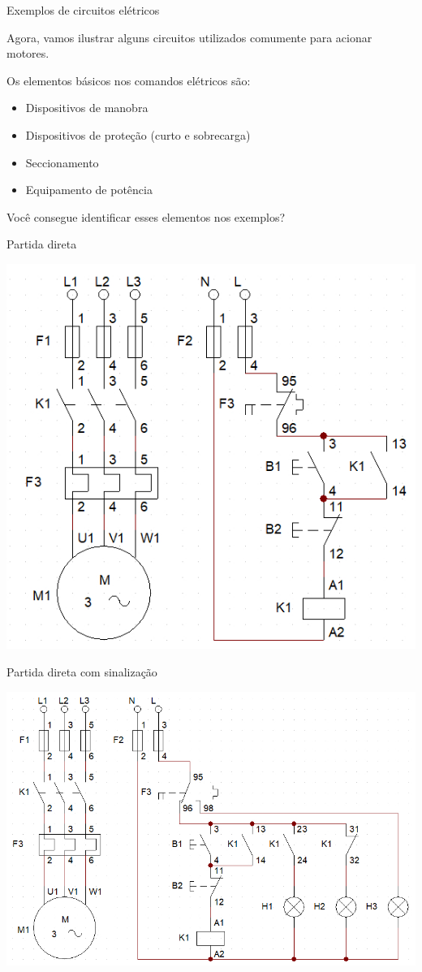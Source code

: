 \begin{frame}{Exemplos de circuitos elétricos}
\begin{block}{}
	Agora, vamos ilustrar alguns circuitos utilizados comumente para acionar motores.
	
	Os elementos básicos nos comandos elétricos são:
	
	\begin{itemize}
		\item Dispositivos de manobra
		\item Dispositivos de proteção (curto e sobrecarga)
		\item Seccionamento
		\item Equipamento de potência
	\end{itemize}

	Você consegue identificar esses elementos nos exemplos?
\end{block}
\end{frame}


\begin{frame}{Partida direta}
\centerline{\includegraphics[width=0.7\linewidth]{Figuras/Ch07/fig12.jpg}}
\end{frame}

\begin{frame}{Partida direta com sinalização}
\centerline{\includegraphics[width=1\linewidth]{Figuras/Ch07/fig13.jpg}}
\end{frame}

